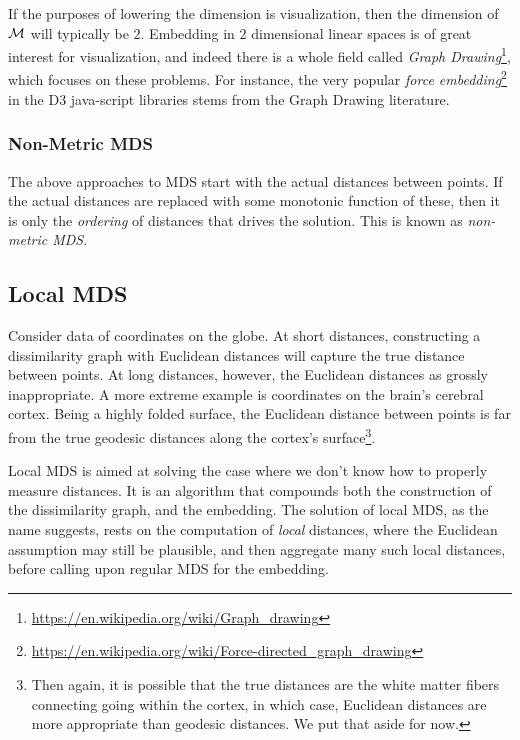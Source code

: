 \documentclass[12pt,a4paper]{article}
\begin{document}
\begin{remark}
	If the purposes of lowering the dimension is visualization, then the dimension of $\mathcal{M}$ will typically be $2$. 
	Embedding in $2$ dimensional linear spaces is of great interest for visualization, and indeed there is a whole field called \emph{Graph Drawing}\footnote{\url{https://en.wikipedia.org/wiki/Graph_drawing}}, which focuses on these problems.
	For instance, the very popular \emph{force embedding}\footnote{\url{https://en.wikipedia.org/wiki/Force-directed_graph_drawing}} in the D3 java-script libraries stems from the Graph Drawing literature. 
\end{remark}



\subsubsection{Non-Metric MDS}
The above approaches to MDS start with the actual distances between points. 
If the actual distances are replaced with some monotonic function of these, then it is only the \emph{ordering} of distances that drives the solution.
This is known as \emph{non-metric MDS}.





\subsection{Local MDS}
\label{sec:localMDS}

\begin{example}
\label{ex:non-euclidean}
	Consider data of coordinates on the globe. 
	At short distances, constructing a dissimilarity graph with Euclidean distances will capture the true distance between points. 
	At long distances, however, the Euclidean distances as grossly inappropriate. 
	A more extreme example is coordinates on the brain's cerebral cortex.
	Being a highly folded surface, the Euclidean distance between points is far from the true geodesic distances along the cortex's surface\footnote{Then again, it is possible that the true distances are the white matter fibers connecting going within the cortex, in which case, Euclidean distances are more appropriate than geodesic distances. We put that aside for now.}.
\end{example}

Local MDS is aimed at solving the case where we don't know how to properly measure distances. 
It is an algorithm that compounds both the construction of the dissimilarity graph, and the embedding. 
The solution of local MDS, as the name suggests, rests on the computation of \emph{local} distances, where the Euclidean assumption may still be plausible, and then aggregate many such local distances, before calling upon regular MDS for the embedding.
\end{document}
